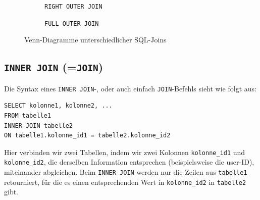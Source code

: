 \begin{figure}[htbp]
\begin{subfigure}[b]{0.45\textwidth}
    \centering
    \caption{\lstinline[style=sql]|RIGHT OUTER JOIN|}
\end{subfigure}
\hfill
\begin{subfigure}[b]{0.45\textwidth}
    \centering
    \caption{\lstinline[style=sql]|FULL OUTER JOIN|}
\end{subfigure}
\caption{Venn-Diagramme unterschiedlicher SQL-Joins}
\label{fig:venn-joins}
\end{figure}


\subsection{\lstinline[style=sql]|INNER JOIN| (=\lstinline[style=sql]|JOIN|)}
Die Syntax eines \lstinline[style=sql]|INNER JOIN|-, oder auch einfach \lstinline[style=sql]|JOIN|-Befehls sieht wie folgt aus:

\begin{lstlisting}[style=sql]
SELECT kolonne1, kolonne2, ...
FROM tabelle1
INNER JOIN tabelle2
ON tabelle1.kolonne_id1 = tabelle2.kolonne_id2
\end{lstlisting}
Hier verbinden wir zwei Tabellen, indem wir zwei Kolonnen \texttt{kolonne\_id1} und \texttt{kolonne\_id2}, die derselben Information entsprechen (beispielsweise die user-ID), miteinander abgleichen. Beim \lstinline[style=sql]|INNER JOIN| werden nur die Zeilen aus \texttt{tabelle1} retourniert, für die es einen entsprechenden Wert in \texttt{kolonne\_id2} in \texttt{tabelle2} gibt. 

